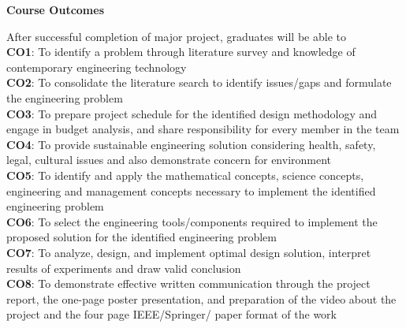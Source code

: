 \begin{titlepage}
\begin{center}
{\Large \textbf{Course Outcomes}}
\end{center}
After successful completion of major project, graduates will be able  to\\
{\small \textbf{CO1}: To identify a problem through literature survey and knowledge of contemporary engineering technology \\      
\textbf{CO2}: To consolidate the literature search to identify issues/gaps and formulate the engineering problem \\
\textbf{CO3}: To prepare project schedule for the identified design methodology and engage in budget analysis, and share responsibility for every member in the team\\
\textbf{CO4}: To provide sustainable  engineering solution considering health, safety, legal, cultural issues and also demonstrate concern for environment \\
\textbf{CO5}: To identify and apply the mathematical concepts, science concepts, engineering and management concepts necessary to implement the identified engineering problem \\
\textbf{CO6}: To select the engineering tools/components required to implement the proposed solution for the identified engineering problem\\
\textbf{CO7}: To analyze, design, and implement optimal design solution, interpret results of  experiments and draw valid conclusion \\
\textbf{CO8}: To demonstrate effective written communication through the project report, the one-page poster presentation, and preparation of the video about the project and the four page IEEE/Springer/ paper format of the work\\
}
\end{titlepage}
